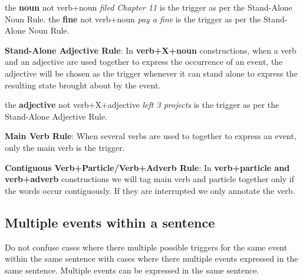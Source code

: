 \begin{exe}
    \ex {}
        \expl the \textbf{noun}  not verb+noun \textit{filed Chapter 11} is the trigger as per the Stand-Alone Noun Rule.
    \ex {}
        \expl the \textbf{fine}  not verb+noun \textit{pay a fine} is the trigger as per the Stand-Alone Noun Rule.
\end{exe}

\noindent\textbf{Stand-Alone Adjective Rule}:
In \textbf{verb+X+noun} constructions, when a verb and an adjective are used together to express the occurrence of an event, the adjective will be chosen as the trigger whenever it can stand alone to express the resulting state brought about by the event.

\begin{exe}
    \ex {}
        \expl the \textbf{adjective}  not verb+X+adjective \textit{left 3 projects} is the trigger as per the Stand-Alone Adjective Rule.
\end{exe}

\noindent\textbf{Main Verb Rule}: When several verbs are used to together to express an event, only the main verb is the trigger.
\begin{exe}
    \ex {}
    \ex {}
    \ex {}
    \ex {}
\end{exe}

\noindent\textbf{Contiguous Verb+Particle/Verb+Adverb Rule}: In \textbf{verb+particle and verb+adverb} constructions we will tag main verb and particle together only if the words occur contiguously. If they are interrupted we only annotate the verb.
\begin{exe}
    \ex {}
    \ex {}
    \ex {}
    \ex {}
\end{exe}

\subsection{Multiple events within a sentence}
Do not confuse cases where there multiple possible triggers for the same event within the same sentence with cases where there multiple events expressed in the same sentence.
Multiple events can be expressed in the same sentence.

